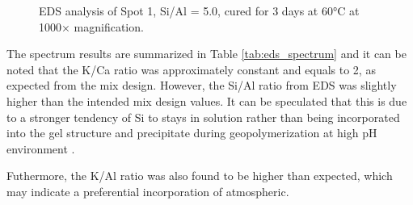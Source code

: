 \begin{figure}[H]
    \centering
    \hfill
    \caption{EDS analysis of Spot 1, Si/Al = 5.0, cured for 3 days at 60°C at 1000× magnification.}
    \label{fig:eds_spot1_5-0}
\end{figure}

The spectrum results are summarized in Table \ref{tab:eds_spectrum} and it can be noted that the K/Ca ratio was approximately constant and equals to 2, as expected from the mix design.
However, the Si/Al ratio from EDS was slightly higher than the intended mix design values.
It can be speculated that this is due to a stronger tendency of Si to stays in solution rather than being incorporated into the gel structure and precipitate during geopolymerization at high pH environment \cite{chen2024synthesis}.

Futhermore, the K/Al ratio was also found to be higher than expected, which may indicate a preferential incorporation of atmospheric.


